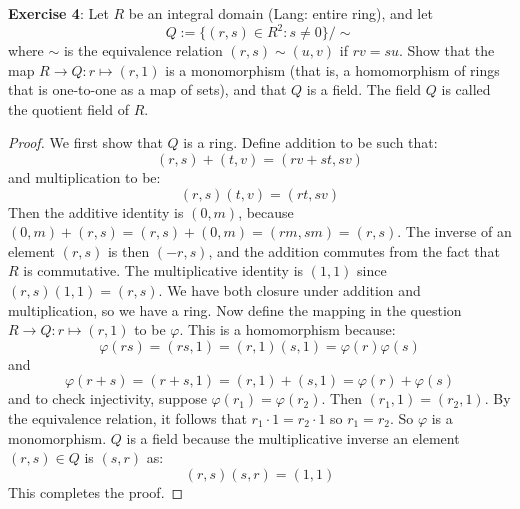\documentclass{article}
\begin{document}
\textbf{Exercise 4}: Let $R$ be an integral domain (Lang: entire ring), and let
    \begin{equation*}
        Q := \{(r, s) \in R^{2} : s \neq 0\}/\sim 
    \end{equation*}
where $\sim $ is the equivalence relation $(r, s) \sim (u, v)$ if $rv = su$. Show that the map $R \rightarrow Q: r \mapsto (r, 1)$ is a monomorphism (that is, a homomorphism of rings that is one-to-one as a map of sets), and that $Q$ is a field. The field $Q$ is called the quotient field of $R$.
    \begin{proof}
        We first show that $Q$ is a ring. Define addition to be such that:
            \begin{equation*}
                (r, s) + (t, v) = (rv + st, sv) 
            \end{equation*}
        and multiplication to be:
            \begin{equation*}
                (r, s)(t, v) = (rt, sv)
            \end{equation*}
        Then the additive identity is $(0, m)$, because $(0, m) + (r, s) = (r, s) + (0, m) = (rm, sm) = (r, s)$. The inverse of an element $(r, s)$ is then $(-r, s)$, and the addition commutes from the fact that $R$ is commutative. The multiplicative identity is $(1, 1)$ since $(r, s)(1, 1) = (r, s)$. We have both closure under addition and multiplication, so we have a ring. Now define the mapping in the question $R \rightarrow Q : r \mapsto (r, 1)$ to be $\varphi$. This is a homomorphism because:
            \begin{equation*}
                \varphi(rs) = (rs, 1) = (r, 1)(s, 1) = \varphi(r)\varphi(s)
            \end{equation*}
        and 
            \begin{equation*}
                \varphi(r + s) = (r + s, 1) = (r, 1) + (s, 1) = \varphi(r) + \varphi(s)
            \end{equation*}
        and to check injectivity, suppose $\varphi(r_{1}) = \varphi(r_{2})$. Then $(r_{1}, 1) = (r_{2}, 1)$. By the equivalence relation, it follows that $r_{1} \cdot 1 = r_{2} \cdot 1$ so $r_{1} = r_{2}$. So $\varphi$ is a monomorphism. $Q$ is a field because the multiplicative inverse an element $(r, s) \in Q$ is $(s, r)$ as:
            \begin{equation*}
                (r, s)(s, r) = (1, 1)
            \end{equation*}
        This completes the proof.
    \end{proof}
\end{document}
